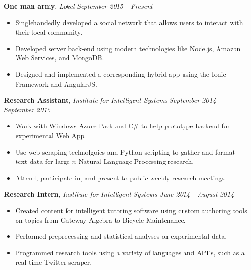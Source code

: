 \documentclass[9pt]{article}
\newenvironment{changemargin}[2]{%
  \begin{list}{}{%
    \setlength{\topsep}{0pt}%
    \setlength{\leftmargin}{#1}%
    \setlength{\rightmargin}{#2}%
    \setlength{\listparindent}{\parindent}%
    \setlength{\itemindent}{\parindent}%
    \setlength{\parsep}{\parskip}%
  }%
  \item[]}{\end{list}
}
\newenvironment{body} {
	\vspace*{-16pt}
	\begin{changemargin}{-0.25in}{-0.5in}
  }	
	{\end{changemargin}
}
\begin{document}
\begin{body}
	\vspace{14pt}
	
	\textbf{One man army}, \emph{Lokel} \hfill \emph{September 2015 - Present}\\
	\vspace*{-4pt}
	\begin{itemize} \itemsep -0pt  %
		\item Singlehandedly developed a social network that allows users to interact with their local community.
		\item Developed server back-end using modern technologies like Node.js, Amazon Web Services, and MongoDB.
		\item Designed and implemented a corresponding hybrid app using the Ionic Framework and AngularJS.
	\end{itemize}
    
	\textbf{Research Assistant}, \emph{Institute for Intelligent Systems} \hfill \emph{September 2014 - September 2015}\\
	\vspace*{-4pt}
	\begin{itemize} \itemsep -0pt  %
		\item Work with Windows Azure Pack and C\# to help prototype backend for experimental Web App.
		\item Use web scraping technolgoies and Python scripting to gather and format text data for large $n$ Natural Language Processing research.
		\item Attend, participate in, and present to public weekly research meetings.
	\end{itemize}
	
	\textbf{Research Intern}, \emph{Institute for Intelligent Systems} \hfill \emph{June 2014 - August 2014}\\
	\vspace*{-4pt}
	\begin{itemize} \itemsep -0pt  %
		\item Created content for intelligent tutoring software using custom authoring tools on topics from Gateway Algebra to Bicycle Maintenance.
		\item Performed preprocessing and statistical analyses on experimental data.
		\item Programmed research tools using a variety of languages and API's, such as a real-time Twitter scraper.
	\end{itemize}
	


\end{body}
\end{document}
